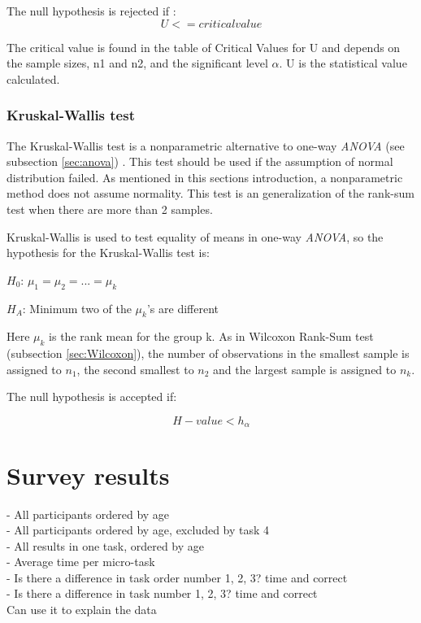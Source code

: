 The null hypothesis is rejected if \citep{LaMorte2017}: \\

\begin{equation}
\label{eq:mannwhitey-ciritcalvalue}
U <= critical value
\end{equation}

The critical value is found in the table of Critical Values for U and depends on the sample sizes, n1 and n2, and the significant level $\alpha$. U is the statistical value calculated. 

\subsubsection[Kruskal]{Kruskal-Wallis test}\label{sec:kruskal-w-test}
The Kruskal-Wallis test is a nonparametric alternative to one-way \textit{ANOVA} (see subsection \ref{sec:anova})  \citep{Walpole2012}. This test should be used if the assumption of normal distribution failed. As mentioned in this sections introduction, a nonparametric method does not assume normality. This test is an generalization of the rank-sum test when there are more than 2 samples.

Kruskal-Wallis is used to test equality of means in one-way \textit{ANOVA}, so the hypothesis for the Kruskal-Wallis test is:\newline

\centerline{$H_{0}$:  $\mu_{1} =  \mu_{2} = ... = \mu_{k} $} 
\centerline{$H_{A}$: Minimum two of the $\mu_{k}$'s are different}

Here $\mu_{k}$ is the rank mean for the group k. As in Wilcoxon Rank-Sum test (subsection \ref{sec:Wilcoxon}), the number of observations in the smallest sample is assigned to $n_1$, the second smallest to $n_2$ and the largest sample is assigned to $n_k$. 

The null hypothesis is accepted if: 

\begin{equation}
\label{eq:kruskapw-accept}
H-value < h_{\alpha}
\end{equation}

\section{Survey results}\label{sec:survey_results}


- All participants ordered by age \\
- All participants ordered by age, excluded by task 4 \\
- All results in one task, ordered by age \\ 
- Average time per micro-task \\
- Is there a difference in task order number 1, 2, 3? time and correct \\
- Is there a difference in task number 1, 2, 3? time and correct  \\
Can use it to explain the data


